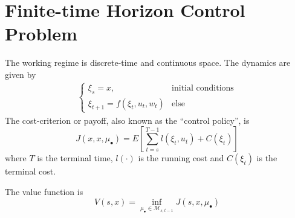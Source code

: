\documentclass[lecture,12pt,]{pcms-l}
\theoremstyle{example}
\begin{document}
\section{Finite-time Horizon Control Problem}
The working regime is discrete-time and continuous space. The dynamics are given by
\begin{align*}
\begin{cases}
\xi_s = x, & \text{initial conditions} \\
\xi_{t+1} = f(\xi_t,u_t,w_t) & \text{else}
\end{cases}
\end{align*}
The cost-criterion or payoff, also known as the ``control policy'', is
$$J(x,x,\mu_\bullet) = E\left[\sum_{t=s}^{T-1} l(\xi_t,u_t) + C(\xi_t)\right]$$
where $T$ is the terminal time, $l(\cdot)$ is the running cost and $C(\xi_t)$ is the terminal cost.

The value function is
$$V(s,x) = \inf_{\mu_\bullet\in\mathcal{M}_{s,t-1}}J(s,x,\mu_\bullet)$$
\end{document}
